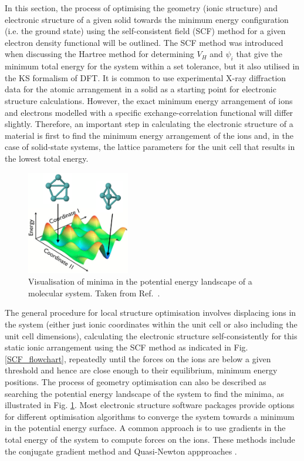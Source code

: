 \documentclass[11pt, twoside]{report}
\begin{document}
In this section, the process of optimising the geometry (ionic structure) and electronic structure of a given solid towards the minimum energy configuration (i.e. the ground state) using the self-consistent field (SCF) method for a given electron density functional will be outlined. The SCF method was introduced when discussing the Hartree method for determining $V_H$ and $\psi_i$ that give the minimum total energy for the system within a set tolerance, but it also utilised in the KS formalism of DFT. It is common to use experimental X-ray diffraction data for the atomic arrangement in a solid as a starting point for electronic structure calculations. However, the exact minimum energy arrangement of ions and electrons modelled with a specific exchange-correlation functional will differ slightly. Therefore, an important step in calculating the electronic structure of a material is first to find the minimum energy arrangement of the ions and, in the case of solid-state systems, the lattice parameters for the unit cell that results in the lowest total energy.
\begin{figure}[h!]
  \centering
    \includegraphics[width=0.4\textwidth]{figures/PE_landscape}
    \caption[Visualisation of minima in the potential energy landscape of a molecular system.]{Visualisation of minima in the potential energy landscape of a molecular system. Taken from Ref.~.}
  \label{PE_landscape}
\end{figure}

The general procedure for local structure optimisation involves displacing ions in the system (either just ionic coordinates within the unit cell or also including the unit cell dimensions), calculating the electronic structure self-consistently for this static ionic arrangement using the SCF method as indicated in Fig. \ref{SCF_flowchart}, repeatedly until the forces on the ions are below a given threshold and hence are close enough to their equilibrium, minimum energy positions. The process of geometry optimisation can also be described as searching the potential energy landscape of the system to find the minima, as illustrated in Fig. \ref{PE_landscape}. Most electronic structure software packages provide options for different optimisation algorithms to converge the system towards a minimum in the potential energy surface. A common approach is to use gradients in the total energy of the system to compute forces on the ions. These methods include the conjugate gradient method and Quasi-Newton appproaches \cite{FHI-aims_slides_Lange}.
\end{document}
